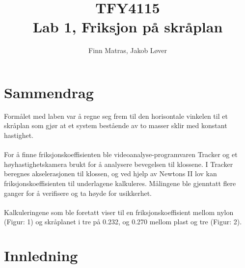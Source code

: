 \documentclass[10pt,a4paper]{report}
\author{Finn Matras, Jakob Løver}
\title{{\LARGE TFY4115}\\{\large Lab 1, Friksjon på skråplan}}
\begin{document}
\renewcommand{\contentsname}{Innhold}
\renewcommand{\cftchapleader}{\cftdotfill{\cftdotsep}}
\renewcommand{\cftpartleader}{\cftdotfill{\cftdotsep}}

\maketitle
\tableofcontents

\chapter*{Sammendrag}
Formålet med laben var å regne seg frem til den horisontale vinkelen til et skråplan som gjør at et system bestående av to masser sklir med konstant hastighet.\\
\\For å finne friksjonskoeffisienten ble videoanalyse-programvaren Tracker og et høyhastighetskamera brukt for å analysere bevegelsen til klossene. I Tracker beregnes akselerasjonen til klossen, og ved hjelp av Newtons II lov kan friksjonskoeffisienten til underlagene kalkuleres. Målingene ble gjenntatt flere ganger for å verifisere og ta høyde for usikkerhet.\\
\\Kalkuleringene som ble foretatt viser til en friksjonskoeffisient mellom nylon (Figur: 1) og skråplanet i tre på 0.232, og 0.270 mellom plast og tre (Figur: 2).


{\let\clearpage\relax\chapter*{Innledning}}
\end{document}
